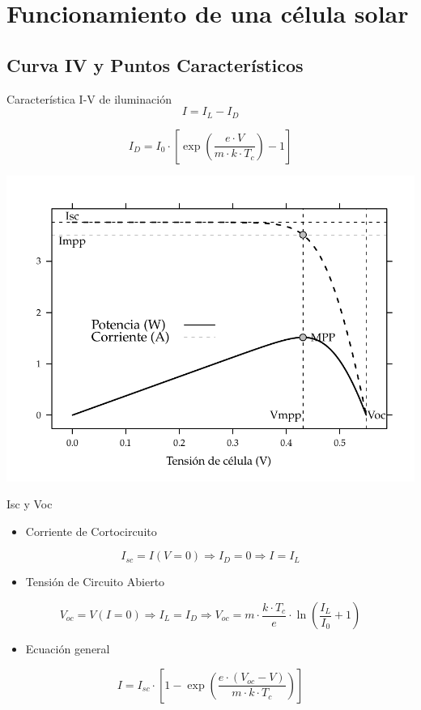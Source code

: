 \documentclass[xcolor={usenames,svgnames,dvipsnames}]{beamer}
\begin{document}
\section{Funcionamiento de una célula solar}
\label{sec-3}

\subsection{Curva IV y Puntos Característicos}
\label{sec-3-1}
\begin{frame}[label=sec-3-1-1]{Característica I-V de iluminación}
$$I=I_{L}-I_{D}$$

$$I_{D}=I_{0}\cdot\left[\exp\left(\frac{e\cdot V}{m\cdot k\cdot
      T_{c}}\right)-1\right]$$

\includegraphics[width=.9\linewidth]{../figs/CurvaIV_Ta20_G800.pdf}
\end{frame}

\begin{frame}[label=sec-3-1-2]{Isc y Voc}
\begin{itemize}
\item Corriente de Cortocircuito
\end{itemize}

$$I_{sc}=I(V=0)\Rightarrow I_{D}=0\Rightarrow I=I_{L}$$

\begin{itemize}
\item Tensión de Circuito Abierto
\end{itemize}

$$V_{oc}=V(I=0)\Rightarrow I_{L}=I_{D}\Rightarrow
V_{oc}=m\cdot\frac{k\cdot
  T_{c}}{e}\cdot\ln\left(\frac{I_{L}}{I_{0}}+1\right)$$

\begin{itemize}
\item Ecuación general
\end{itemize}

$$I=I_{sc}\cdot\left[1-\exp\left(\frac{e\cdot(V_{oc}-V)}{m\cdot k\cdot
      T_{c}}\right)\right]$$
\end{frame}
\end{document}
